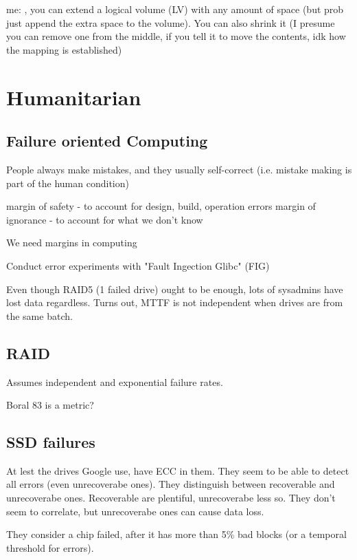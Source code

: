 \documentclass[a4paper]{article}
\begin{document}
        me: , you can extend a logical volume (LV) with any amount of space (but
        prob just append the extra space to the volume). You can also shrink it (I
        presume you can remove one from the middle, if you tell it to move the
        contents, idk how the mapping is established)


\section{Humanitarian}
    \subsection{Failure oriented Computing}

        People always make mistakes, and they usually self-correct (i.e.
        mistake making is part of the human condition)

        margin of safety - to account for design, build, operation errors
        margin of ignorance - to account for what we don't know

        We need margins in computing

        Conduct error experiments with "Fault Ingection Glibc" (FIG)

        Even though RAID5 (1 failed drive) ought to be enough, lots of
        sysadmins have lost data regardless. Turns out, MTTF is not independent
        when drives are from the same batch.

    \subsection{RAID}
        Assumes independent and exponential failure rates.

        Boral 83 is a metric?

    \subsection{SSD failures}

        At lest the drives Google use, have ECC in them. They seem to be able
        to detect all errors (even unrecoverabe ones). They distinguish between
        recoverable and unrecoverabe ones. Recoverable are plentiful,
        unrecoverabe less so. They don't seem to correlate, but unrecoverabe
        ones can cause data loss.

        They consider a chip failed, after it has more than 5\% bad blocks (or
        a temporal threshold for errors).
\end{document}
